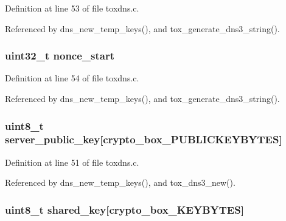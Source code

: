 Definition at line 53 of file toxdns.\+c.



Referenced by dns\+\_\+new\+\_\+temp\+\_\+keys(), and tox\+\_\+generate\+\_\+dns3\+\_\+string().

\hypertarget{struct_d_n_s___object_a9bf0718fc917292d63aa2667d22c0502}{
\subsubsection[{nonce\+\_\+start}]{\setlength{\rightskip}{0pt plus 5cm}uint32\+\_\+t nonce\+\_\+start}}\label{struct_d_n_s___object_a9bf0718fc917292d63aa2667d22c0502}


Definition at line 54 of file toxdns.\+c.



Referenced by dns\+\_\+new\+\_\+temp\+\_\+keys(), and tox\+\_\+generate\+\_\+dns3\+\_\+string().

\hypertarget{struct_d_n_s___object_acc2e1517636c724d8778c873a4fce5e1}{
\subsubsection[{server\+\_\+public\+\_\+key}]{\setlength{\rightskip}{0pt plus 5cm}uint8\+\_\+t server\+\_\+public\+\_\+key\mbox{[}crypto\+\_\+box\+\_\+\+P\+U\+B\+L\+I\+C\+K\+E\+Y\+B\+Y\+T\+E\+S\mbox{]}}}\label{struct_d_n_s___object_acc2e1517636c724d8778c873a4fce5e1}


Definition at line 51 of file toxdns.\+c.



Referenced by dns\+\_\+new\+\_\+temp\+\_\+keys(), and tox\+\_\+dns3\+\_\+new().

\hypertarget{struct_d_n_s___object_a0f4a120c7bd84eb7beebe6c163ce5744}{
\subsubsection[{shared\+\_\+key}]{\setlength{\rightskip}{0pt plus 5cm}uint8\+\_\+t shared\+\_\+key\mbox{[}{\bf crypto\+\_\+box\+\_\+\+K\+E\+Y\+B\+Y\+T\+E\+S}\mbox{]}}}\label{struct_d_n_s___object_a0f4a120c7bd84eb7beebe6c163ce5744}


